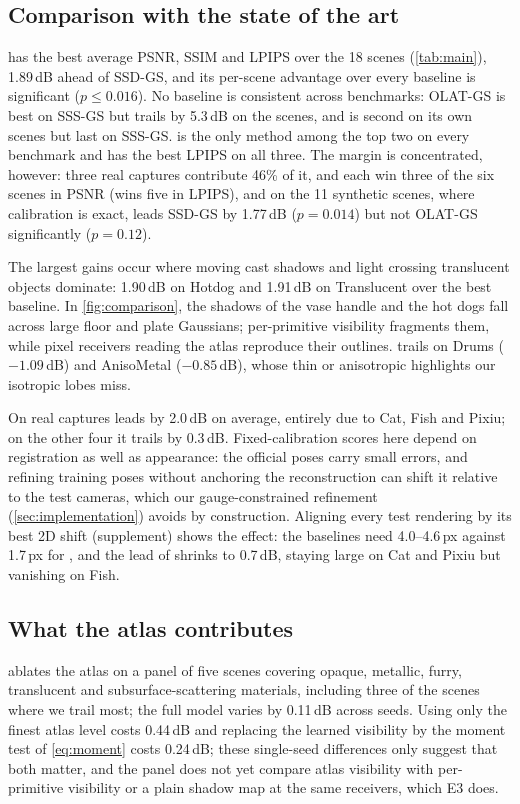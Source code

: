 \subsection{Comparison with the state of the art}
\label{sec:exp_main}
\ours has the best average PSNR, SSIM and LPIPS over the 18 scenes (\cref{tab:main}), 1.89\,dB ahead of SSD-GS, and its per-scene advantage over every baseline is significant ($p\le0.016$).
No baseline is consistent across benchmarks: OLAT-GS is best on SSS-GS but trails \ours by 5.3\,dB on the \gsthree scenes, and \gsthree is second on its own scenes but last on SSS-GS.
\ours is the only method among the top two on every benchmark and has the best LPIPS on all three.
The margin is concentrated, however: three real captures contribute 46\% of it, \ours and \gsthree each win three of the six \gsthree scenes in PSNR (\ours wins five in LPIPS), and on the 11 synthetic scenes, where calibration is exact, \ours leads SSD-GS by 1.77\,dB ($p=0.014$) but not OLAT-GS significantly ($p=0.12$).

The largest gains occur where moving cast shadows and light crossing translucent objects dominate: 1.90\,dB on Hotdog and 1.91\,dB on Translucent over the best baseline.
In \cref{fig:comparison}, the shadows of the vase handle and the hot dogs fall across large floor and plate Gaussians; per-primitive visibility fragments them, while pixel receivers reading the atlas reproduce their outlines.
\ours trails on Drums ($-1.09$\,dB) and AnisoMetal ($-0.85$\,dB), whose thin or anisotropic highlights our isotropic lobes miss.

On real captures \ours leads by 2.0\,dB on average, entirely due to Cat, Fish and Pixiu; on the other four it trails \gsthree by 0.3\,dB.
Fixed-calibration scores here depend on registration as well as appearance: the official poses carry small errors, and refining training poses without anchoring the reconstruction can shift it relative to the test cameras, which our gauge-constrained refinement (\cref{sec:implementation}) avoids by construction.
Aligning every test rendering by its best 2D shift (supplement) shows the effect: the baselines need 4.0--4.6\,px against 1.7\,px for \ours, and the lead of \ours shrinks to 0.7\,dB, staying large on Cat and Pixiu but vanishing on Fish.



\subsection{What the atlas contributes}
\label{sec:exp_atlas}
 ablates the atlas on a panel of five scenes covering opaque, metallic, furry, translucent and subsurface-scattering materials, including three of the scenes where we trail most; the full model varies by 0.11\,dB across seeds.
Using only the finest atlas level costs 0.44\,dB and replacing the learned visibility by the moment test of \cref{eq:moment} costs 0.24\,dB; these single-seed differences only suggest that both matter, and the panel does not yet compare atlas visibility with per-primitive visibility or a plain shadow map at the same receivers, which E3 does.

